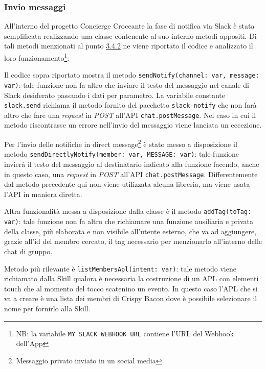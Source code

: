 \subsubsection{Invio messaggi}
All'interno del progetto Concierge Croccante la fase di notifica via Slack è stata semplificata realizzando una classe contenente al suo interno metodi appositi. Di tali metodi menzionati al punto \hyperref[utils]{3.4.2} ne viene riportato il codice e analizzato il loro funzionamento\footnote{NB: la variabile \texttt{MY SLACK WEBHOOK URL} contiene l'URL del Webhook dell'App}: 

Il codice sopra riportato mostra il metodo \texttt{sendNotify(channel:  var, message:  var)}: tale funzione non fa altro che inviare il testo del messaggio nel canale di Slack desiderato passando i dati per parametro. La variabile constante \texttt{slack.send} richiama il metodo fornito del pacchetto \texttt{slack-notify} che non farà altro che fare una \textit{request} in \textit{POST} all'API \texttt{chat.postMessage}. Nel caso in cui il metodo riscontrasse un errore nell'invio del messaggio viene lanciata un eccezione.

\newpage

Per l'invio delle notifiche in direct message\footnote{Messaggio privato inviato in un social media} è stato messo a disposizione il metodo \texttt{sendDirectlyNotify(member:  var, MESSAGE:  var)}: tale funzione invierà il testo del messaggio al destinatario indicato alla funzione facendo, anche in questo caso, una \textit{request} in \textit{POST} all'API \texttt{chat.postMessage}. Differentemente dal metodo precedente qui non viene utilizzata alcuna libreria, ma viene usata l'API in maniera diretta.

\newpage

Altra funzionalità messa a disposizione dalla classe è il metodo \texttt{addTag(toTag: var)}: tale funzione non fa altro che richiamare una funzione ausiliaria e privata della classe, più elaborata e non visibile all'utente esterno, che va ad aggiungere, grazie all'id del membro cercato, il tag necessario per menzionarlo all'interno delle chat di gruppo.

\newpage

Metodo più rilevante è \texttt{listMembersApl(intent: var)}: tale metodo viene richiamato dalla Skill qualora è necessaria la costruzione di un APL con elementi touch che al momento del tocco scatenino un evento. In questo caso l'APL che si va a creare è una lista dei membri di Crispy Bacon dove è possibile selezionare il nome per fornirlo alla Skill. 

